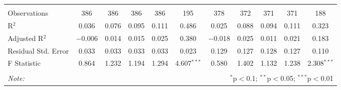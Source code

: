 \begin{table}[H]
\begin{tabular}{@{\extracolsep{4pt}}lcccccccccc}
  & & & & & & & & & & \\ 
\hline \\[-1.8ex] 
Observations & 386 & 386 & 386 & 386 & 195 & 378 & 372 & 371 & 371 & 188 \\ 
R$^{2}$ & 0.036 & 0.076 & 0.095 & 0.111 & 0.486 & 0.025 & 0.088 & 0.094 & 0.111 & 0.323 \\ 
Adjusted R$^{2}$ & $-$0.006 & 0.014 & 0.015 & 0.025 & 0.380 & $-$0.018 & 0.025 & 0.011 & 0.021 & 0.183 \\ 
Residual Std. Error & 0.033 & 0.033 & 0.033 & 0.033 & 0.023 & 0.129 & 0.127 & 0.128 & 0.127 & 0.110 \\ 
F Statistic & 0.864 & 1.232 & 1.194 & 1.294 & 4.607$^{***}$ & 0.580 & 1.402 & 1.132 & 1.238 & 2.308$^{***}$ \\ 
\hline 
\hline \\[-1.8ex] 
\textit{Note:}  & \multicolumn{10}{r}{$^{*}$p$<$0.1; $^{**}$p$<$0.05; $^{***}$p$<$0.01} \\ 
\end{tabular} 
\end{table} 
